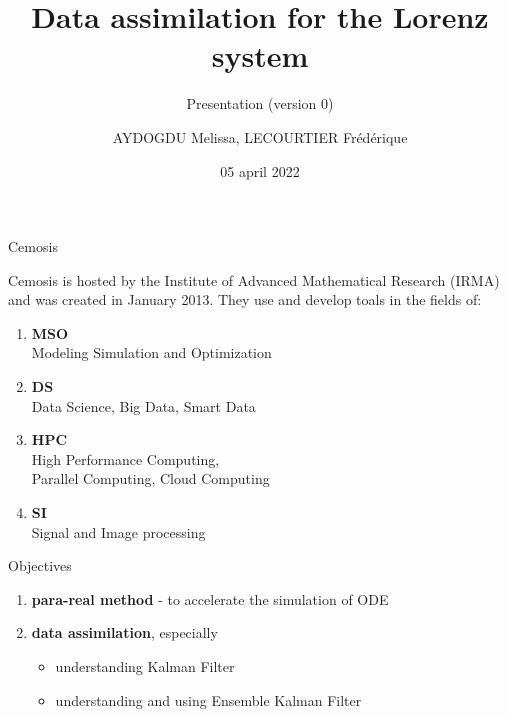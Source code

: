\documentclass[10pt,xcolor={table,dvipsnames},t]{beamer}
\title[Lorenz]{Data assimilation for the Lorenz system}
\subtitle{Presentation (version 0)}
\author[name]{AYDOGDU Melissa, LECOURTIER Frédérique}
\institute{\large Strasbourg University}
\date{05 april 2022}
\begin{document}
	
	\begin{frame}
		\titlepage
	\end{frame}
	
	\AtBeginSection[]{
		\begin{frame}
			\vfill
			\centering
			\begin{beamercolorbox}[sep=5pt,shadow=true,rounded=true]{subtitle}
				\usebeamerfont{title}\insertsectionhead\par%
			\end{beamercolorbox}
			\vfill
		\end{frame}
	}



	\begin{frame}{Cemosis}
		
		\begin{minipage}{0.4\hsize}
		\end{minipage} \quad
		\begin{minipage}{0.5\hsize}
		Cemosis is hosted by the Institute of Advanced Mathematical Research (IRMA) and was created in January 2013. They use and develop toals in the fields of: 
			\begin{enumerate}[\textbullet]
				\item \textbf{MSO} \\
				Modeling Simulation and Optimization
				\item \textbf{DS} \\
				Data Science, Big Data, Smart Data
				\item \textbf{HPC} \\
				High Performance Computing, \\
				Parallel Computing, Cloud Computing
				\item \textbf{SI} \\
				Signal and Image processing
			\end{enumerate}
		\end{minipage}
	\end{frame}

	\begin{frame}{Objectives}
		
		 \begin{enumerate}[\textbullet]
			\item \textbf{para-real method} - \quad to accelerate the simulation of ODE
			\item \textbf{data assimilation}, especially
			\begin{itemize}
				\item understanding Kalman Filter
				\item understanding and using Ensemble Kalman Filter
			\end{itemize}
		\end{enumerate}	 	
		
	\end{frame}
	
\end{document}
